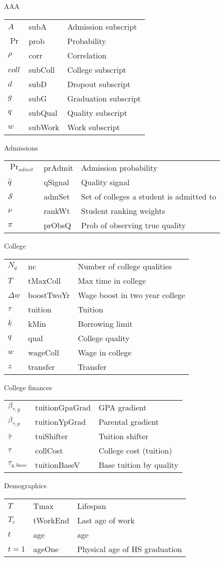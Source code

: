 AAA

\begin{tabular}{lll}
\hline
$A$ & subA & Admission subscript\tabularnewline
$\Pr$ & prob & Probability\tabularnewline
$\rho$ & corr & Correlation\tabularnewline
$coll$ & subColl & College subscript\tabularnewline
$d$ & subD & Dropout subscript\tabularnewline
$g$ & subG & Graduation subscript\tabularnewline
$q$ & subQual & Quality subscript\tabularnewline
$w$ & subWork & Work subscript\tabularnewline
\hline
\end{tabular}
 
Admissions

\begin{tabular}{lll}
\hline
$\Pr_{admit}$ & prAdmit & Admission probability\tabularnewline
$\hat{q}$ & qSignal & Quality signal\tabularnewline
$\mathcal{S}$ & admSet & Set of colleges a student is admitted to\tabularnewline
$\nu$ & rankWt & Student ranking weights\tabularnewline
$\pi$ & prObsQ & Prob of observing true quality\tabularnewline
\hline
\end{tabular}
 
College

\begin{tabular}{lll}
\hline
$N_{q}$ & nc & Number of college qualities\tabularnewline
$T$ & tMaxColl & Max time in college\tabularnewline
$\Delta w$ & boostTwoYr & Wage boost in two year college\tabularnewline
$\tau$ & tuition & Tuition\tabularnewline
$\underline{k}$ & kMin & Borrowing limit\tabularnewline
$q$ & qual & College quality\tabularnewline
$w$ & wageColl & Wage in college\tabularnewline
$z$ & transfer & Transfer\tabularnewline
\hline
\end{tabular}
 
College finances

\begin{tabular}{lll}
\hline
$\beta_{\tau,g}$ & tuitionGpaGrad & GPA gradient\tabularnewline
$\beta_{\tau,p}$ & tuitionYpGrad & Parental gradient\tabularnewline
$\hat{\tau}$ & tuiShifter & Tuition shifter\tabularnewline
$\tau$ & collCost & College cost (tuition)\tabularnewline
$\tau_{q,base}$ & tuitionBaseV & Base tuition by quality\tabularnewline
\hline
\end{tabular}
 
Demographics

\begin{tabular}{lll}
\hline
$T$ & Tmax & Lifespan\tabularnewline
$T_r$ & tWorkEnd & Last age of work\tabularnewline
$t$ & age & age\tabularnewline
$t=1$ & ageOne & Physical age of HS graduation\tabularnewline
\hline
\end{tabular}
 
